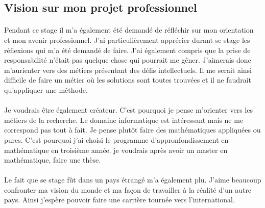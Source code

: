 \subsection{Vision sur mon projet professionnel}
\paragraph{}
Pendant ce stage il m'a également été demandé de réfléchir sur mon orientation et mon avenir professionnel. J'ai particulièrement apprécier durant se stage les réflexions qui m'a été demandé de faire. J'ai également compris que la prise de responsabilité n'était pas quelque chose qui pourrait me gêner. J'aimerais donc m'aurienter vers des métiers présentant des défis intellectuels. Il me serait ainsi difficile de faire un métier où les solutions sont toutes trouvées et il ne faudrait qu'appliquer une méthode.

\paragraph{}
Je voudrais être également créateur. C'est pourquoi je pense m'orienter vers les métiers de la recherche. Le domaine informatique est intéressant mais ne me correspond pas tout à fait. Je pense plutôt faire des mathématiques appliquées ou pures. C'est pourquoi j'ai choisi le programme d'appronfondissement en mathématique en troisième année. je voudrais après avoir un master en mathématique, faire une thèse.

\paragraph{}
Le fait que se stage fût dans un pays étrangé m'a également plu. J'aime beaucoup confronter ma vision du monde et ma façon de travailler à la réalité d'un autre pays. Ainsi j'espère pouvoir faire une carrière tournée vers l'international.
